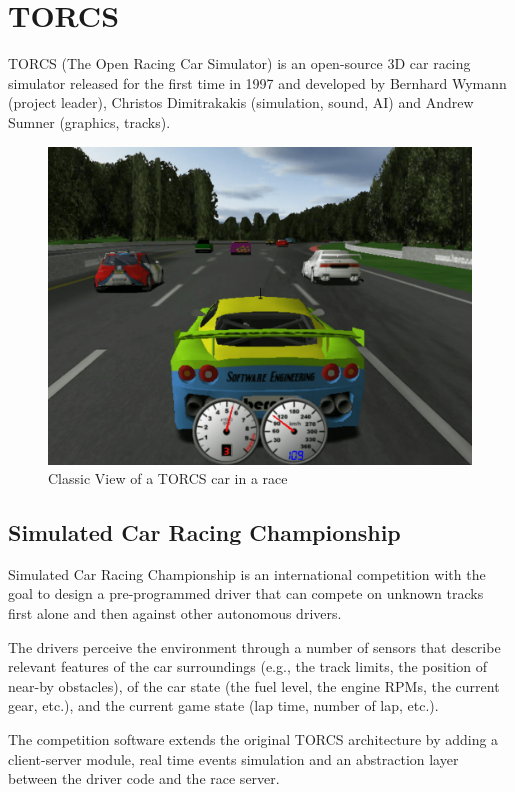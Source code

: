 \documentclass[Lau,oneside,noexaminfo]{sapthesis} %
\begin{document}
\chapter{TORCS}
TORCS (The Open Racing Car Simulator) is an open-source 3D car racing simulator released for the first time in 1997 and developed by Bernhard Wymann (project leader), Christos Dimitrakakis (simulation, sound, AI) and Andrew Sumner (graphics, tracks).
\begin{figure}[H]
\caption{Classic View of a TORCS car in a race}
\centering
\includegraphics[width=\textwidth]{torcs}
\end{figure}
\section{Simulated Car Racing Championship}
\label{SCR}
Simulated Car Racing Championship is an international competition with the goal to design a pre-programmed driver that can compete on unknown tracks first alone and then against other autonomous drivers.

The drivers perceive the environment through a number of sensors that describe relevant features of the car surroundings (e.g., the track limits, the position of near-by obstacles), of the car state (the fuel level, the engine RPMs, the current gear, etc.), and the current game state (lap time, number of lap, etc.).

The competition software extends the original TORCS architecture by adding a client-server module, real time events simulation and an abstraction layer between the driver code and the race server. \cite{SCR}
\end{document}
